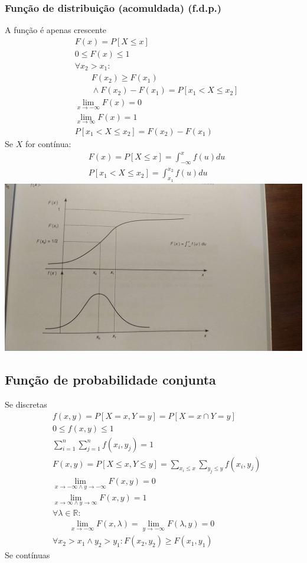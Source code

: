 \documentclass[a4paper]{article}
\begin{document}
\begin{multicols}{3}
\subsubsection{Função de distribuição (acomuldada) (f.d.p.)}
A função é apenas crescente
\begin{align*}
  &F(x) = P[X \leq x] \\
  &0 \leq F(x) \leq 1 \\
  &\forall x_2 > x_1: \\
    &\qquad F(x_2) \geq F(x_1) \\ 
    &\qquad \land F(x_2) - F(x_1) = P[x_1 < X \leq x_2] \\
  &\lim_{x \to -\infty} F(x) = 0 \\ 
  &\lim_{x \to \infty} F(x) = 1 \\
  &P[x_1 < X \leq x_2] = F(x_2) - F(x_1)
\end{align*}
Se $X$ for contínua:
\begin{align*}
  &F(x) = P[X \leq x] = \int_{-\infty}^x f(u) du \\
  &P[x_1 < X \leq x_2] = \int_{x_1}^{x_2} f(u) du
\end{align*}
\includegraphics[width=\columnwidth]{fda.jpg} %
\subsection{Função de probabilidade conjunta}
Se discretas
\begin{align*}
  &f(x, y) = P[X = x, Y = y] = P[X = x \cap Y = y]\\
  &0 \leq f(x, y) \leq 1 \\
  &\sum_{i=1}^n \sum_{j=1}^n f(x_i, y_j) = 1 \\
  &F(x, y) = P[X \leq x, Y \leq y] = \sum_{x_i \leq x} \sum_{y_j \leq y} f(x_i, y_j) \\
  &\lim_{x \to -\infty \land y \to -\infty} F(x, y) = 0 \\
  &\lim_{x \to \infty \land y \to \infty} F(x, y) = 1 \\
  &\forall \lambda \in \mathbb{R}: \\
    &\qquad \lim_{x \to -\infty } F(x, \lambda) = \lim_{y \to -\infty } F(\lambda, y) = 0 \\
  &\forall x_2 > x_1 \land y_2 > y_1: F(x_2, y_2) \geq F(x_1, y_1)
\end{align*}
Se contínuas


\end{multicols}
\end{document}
